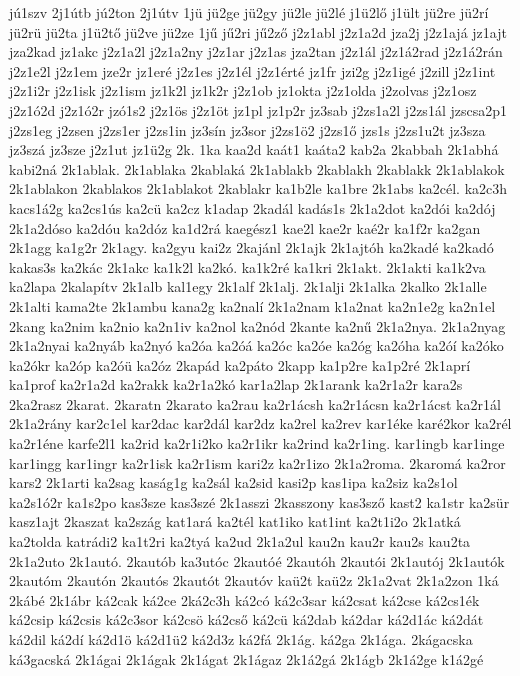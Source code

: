 {jú1szv
2j1útb
jú2ton
2j1útv
1jü
jü2ge
jü2gy
jü2le
jü2lé
j1ü2lő
j1ült
jü2re
jü2rí
jü2rü
jü2ta
j1ü2tő
jü2ve
jü2ze
1jű
jű2ri
jű2ző
j2z1abl
j2z1a2d
jza2j
j2z1ajá
jz1ajt
jza2kad
jz1akc
j2z1a2l
j2z1a2ny
j2z1ar
j2z1as
jza2tan
j2z1ál
j2z1á2rad
j2z1á2rán
j2z1e2l
j2z1em
jze2r
jz1eré
j2z1es
j2z1él
j2z1érté
jz1fr
jzi2g
j2z1igé
j2zill
j2z1int
j2z1i2r
j2z1isk
j2z1ism
jz1k2l
jz1k2r
j2z1ob
jz1okta
j2z1olda
j2zolvas
j2z1osz
j2z1ó2d
j2z1ó2r
jzó1s2
j2z1ös
j2z1öt
jz1pl
jz1p2r
jz3sab
j2zs1a2l
j2zs1ál
jzscsa2p1
j2zs1eg
j2zsen
j2zs1er
j2zs1in
jz3sín
jz3sor
j2zs1ö2
j2zs1ő
jzs1s
j2zs1u2t
jz3sza
jz3szá
jz3sze
j2z1ut
jz1ü2g
2k.
1ka
kaa2d
kaát1
kaáta2
kab2a
2kabbah
2k1abhá
kabi2ná
2k1ablak.
2k1ablaka
2kablaká
2k1ablakb
2kablakh
2kablakk
2k1ablakok
2k1ablakon
2kablakos
2k1ablakot
2kablakr
ka1b2le
ka1bre
2k1abs
ka2cél.
ka2c3h
kacs1á2g
ka2cs1ús
ka2cü
ka2cz
k1adap
2kadál
kadás1s
2k1a2dot
ka2dói
ka2dój
2k1a2dóso
ka2dóu
ka2dóz
ka1d2rá
kaegész1
kae2l
kae2r
kaé2r
ka1f2r
ka2gan
2k1agg
ka1g2r
2k1agy.
ka2gyu
kai2z
2kajánl
2k1ajk
2k1ajtóh
ka2kadé
ka2kadó
kakas3s
ka2kác
2k1akc
ka1k2l
ka2kó.
ka1k2ré
ka1kri
2k1akt.
2k1akti
ka1k2va
ka2lapa
2kalapítv
2k1alb
kal1egy
2k1alf
2k1alj.
2k1alji
2k1alka
2kalko
2k1alle
2k1alti
kama2te
2k1ambu
kana2g
ka2nalí
2k1a2nam
k1a2nat
ka2n1e2g
ka2n1el
2kang
ka2nim
ka2nio
ka2n1iv
ka2nol
ka2nód
2kante
ka2nű
2k1a2nya.
2k1a2nyag
2k1a2nyai
ka2nyáb
ka2nyó
ka2óa
ka2óá
ka2óc
ka2óe
ka2óg
ka2óha
ka2óí
ka2óko
ka2ókr
ka2óp
ka2óü
ka2óz
2kapád
ka2páto
2kapp
ka1p2re
ka1p2ré
2k1aprí
ka1prof
ka2r1a2d
ka2rakk
ka2r1a2kó
kar1a2lap
2k1arank
ka2r1a2r
kara2s
2ka2rasz
2karat.
2karatn
2karato
ka2rau
ka2r1ácsh
ka2r1ácsn
ka2r1ácst
ka2r1ál
2k1a2rány
kar2c1el
kar2dac
kar2dál
kar2dz
ka2rel
ka2rev
kar1éke
karé2kor
ka2rél
ka2r1éne
karfe2l1
ka2rid
ka2r1i2ko
ka2r1ikr
ka2rind
ka2r1ing.
kar1ingb
kar1inge
kar1ingg
kar1ingr
ka2r1isk
ka2r1ism
kari2z
ka2r1izo
2k1a2roma.
2karomá
ka2ror
kars2
2k1arti
ka2sag
kaság1g
ka2sál
ka2sid
kasi2p
kas1ipa
ka2siz
ka2s1ol
ka2s1ó2r
ka1s2po
kas3sze
kas3szé
2k1asszi
2kasszony
kas3sző
kast2
ka1str
ka2sür
kasz1ajt
2kaszat
ka2szág
kat1ará
ka2tél
kat1iko
kat1int
ka2t1i2o
2k1atká
ka2tolda
katrádi2
ka1t2ri
ka2tyá
ka2ud
2k1a2ul
kau2n
kau2r
kau2s
kau2ta
2k1a2uto
2k1autó.
2kautób
ka3utóc
2kautóé
2kautóh
2kautói
2k1autój
2k1autók
2kautóm
2kautón
2kautós
2kautót
2kautóv
kaü2t
kaü2z
2k1a2vat
2k1a2zon
1ká
2kábé
2k1ábr
ká2cak
ká2ce
2ká2c3h
ká2có
ká2c3sar
ká2csat
ká2cse
ká2cs1ék
ká2csip
ká2csis
ká2c3sor
ká2csö
ká2cső
ká2cü
ká2dab
ká2dar
ká2d1ác
ká2dát
ká2dil
ká2dí
ká2d1ö
ká2d1ü2
ká2d3z
ká2fá
2k1ág.
ká2ga
2k1ága.
2kágacska
ká3gacská
2k1ágai
2k1ágak
2k1ágat
2k1ágaz
2k1á2gá
2k1ágb
2k1á2ge
k1á2gé
}
